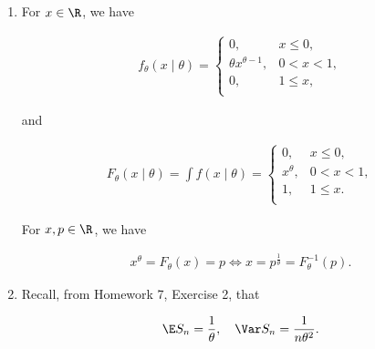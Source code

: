 \begin{solution}

\phantom{}

\begin{enumerate}[label = (\alph*)]

    \item For $x \in \R$, we have

    \begin{align*}
        f_\theta(x \mid \theta)
        =
        \begin{cases}
            0,                     & x \leq 0,  \\
            \theta x^{\theta - 1}, & 0 < x < 1, \\
            0,                     & 1 \leq x,  \\
        \end{cases}
    \end{align*}

    and

    \begin{align*}
        F_\theta(x \mid \theta)
        =
        \int f(x \mid \theta)
        =
        \begin{cases}
            0,        & x \leq 0,  \\
            x^\theta, & 0 < x < 1, \\
            1,        & 1 \leq  x.   \\
        \end{cases}
    \end{align*}
    
    For $x, p \in \R$, we have

    \begin{align*}
        x^\theta = F_\theta(x) = p
        \iff
        x = p^\frac{1}{\theta} = F_\theta^{-1}(p).
    \end{align*}

    \item Recall, from Homework 7, Exercise 2, that
    
    \begin{align*}
        \E S_n = \frac{1}{\theta},
        \quad
        \Var S_n = \frac{1}{n \theta^2}.
    \end{align*}

\end{enumerate}



\end{solution}


